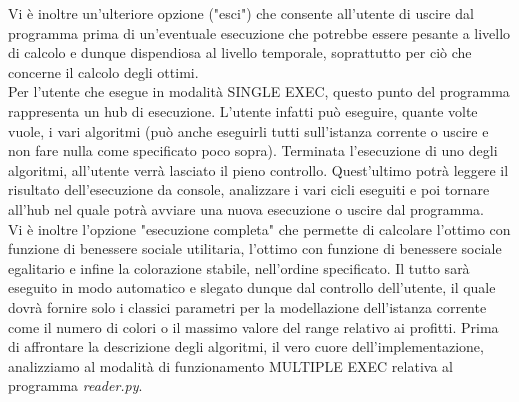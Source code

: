 Vi è inoltre un'ulteriore opzione ("esci") che consente all'utente di uscire dal programma prima di un'eventuale esecuzione che potrebbe essere pesante a livello di calcolo e dunque dispendiosa al livello temporale, soprattutto per ciò che concerne il calcolo degli ottimi.\\
Per l'utente che esegue in modalità SINGLE EXEC, questo punto del programma rappresenta un hub di esecuzione. L'utente infatti può eseguire, quante volte vuole, i vari algoritmi (può anche eseguirli tutti sull'istanza corrente o uscire e non fare nulla come specificato poco sopra). Terminata l'esecuzione di uno degli algoritmi, all'utente verrà lasciato il pieno controllo. Quest'ultimo potrà leggere il risultato dell'esecuzione da console, analizzare i vari cicli eseguiti e poi tornare all'hub nel quale potrà avviare una nuova esecuzione o uscire dal programma.\\
Vi è inoltre l'opzione "esecuzione completa" che permette di calcolare l'ottimo con funzione di benessere sociale utilitaria, l'ottimo con funzione di benessere sociale egalitario e infine la colorazione stabile, nell'ordine specificato. Il tutto sarà eseguito in modo automatico e slegato dunque dal controllo dell'utente, il quale dovrà fornire solo i classici parametri per la modellazione dell'istanza corrente come il numero di colori o il massimo valore del range relativo ai profitti. Prima di affrontare la descrizione degli algoritmi, il vero cuore dell'implementazione, analizziamo al modalità di funzionamento MULTIPLE EXEC relativa al programma \textit{reader.py}.\\

